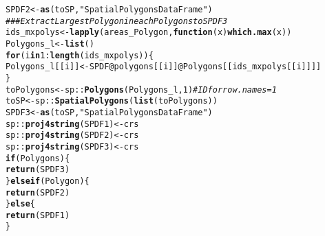 \documentclass[a4paper,12pt,times,numbered,print,index]{Classes/PhDThesisPSnPDF}\usepackage[]{graphicx}\usepackage[]{color}
\makeatletter
\newcommand{\hlnum}[1]{\textcolor[rgb]{0.686,0.059,0.569}{#1}}%
\newcommand{\hlstr}[1]{\textcolor[rgb]{0.192,0.494,0.8}{#1}}%
\newcommand{\hlcom}[1]{\textcolor[rgb]{0.678,0.584,0.686}{\textit{#1}}}%
\newcommand{\hlopt}[1]{\textcolor[rgb]{0,0,0}{#1}}%
\newcommand{\hlstd}[1]{\textcolor[rgb]{0.345,0.345,0.345}{#1}}%
\newcommand{\hlkwa}[1]{\textcolor[rgb]{0.161,0.373,0.58}{\textbf{#1}}}%
\newcommand{\hlkwb}[1]{\textcolor[rgb]{0.69,0.353,0.396}{#1}}%
\newcommand{\hlkwc}[1]{\textcolor[rgb]{0.333,0.667,0.333}{#1}}%
\newcommand{\hlkwd}[1]{\textcolor[rgb]{0.737,0.353,0.396}{\textbf{#1}}}%
\newenvironment{kframe}{%
 \def\at@end@of@kframe{}%
 \ifinner\ifhmode%
  \def\at@end@of@kframe{\end{minipage}}%
  \begin{minipage}{\columnwidth}%
 \fi\fi%
 \def\FrameCommand##1{\hskip\@totalleftmargin \hskip-\fboxsep
 \colorbox{shadecolor}{##1}\hskip-\fboxsep
     \hskip-\linewidth \hskip-\@totalleftmargin \hskip\columnwidth}%
 \MakeFramed {\advance\hsize-\width
   \@totalleftmargin\z@ \linewidth\hsize
   \@setminipage}}%
 {\par\unskip\endMakeFramed%
 \at@end@of@kframe}
\newenvironment{knitrout}{}{} %
\renewenvironment{knitrout}{\begin{singlespace}}{\end{singlespace}}
\makeatother
\begin{document}
\begin{appendices}
\begin{knitrout}
\begin{kframe}
\begin{alltt}
        \hlstd{SPDF2}  \hlkwb{<-} \hlkwd{as}\hlstd{(toSP,} \hlstr{"SpatialPolygonsDataFrame"}\hlstd{)}
        \hlcom{### Extract Largest Polygon in each Polygons to SPDF3}
        \hlstd{ids_mxpolys} \hlkwb{<-} \hlkwd{lapply}\hlstd{(areas_Polygon,} \hlkwa{function}\hlstd{(}\hlkwc{x}\hlstd{)} \hlkwd{which.max}\hlstd{(x))}
        \hlstd{Polygons_l}  \hlkwb{<-} \hlkwd{list}\hlstd{()}
        \hlkwa{for} \hlstd{(i} \hlkwa{in} \hlnum{1}\hlopt{:}\hlkwd{length}\hlstd{(ids_mxpolys)) \{}
             \hlstd{Polygons_l[[i]]} \hlkwb{<-} \hlstd{SPDF}\hlopt{@}\hlkwc{polygons}\hlstd{[[i]]}\hlopt{@}\hlkwc{Polygons}\hlstd{[[ids_mxpolys[[i]]]]}
        \hlstd{\}}
        \hlstd{toPolygons}  \hlkwb{<-} \hlstd{sp::}\hlkwd{Polygons}\hlstd{(Polygons_l,} \hlnum{1}\hlstd{)} \hlcom{#ID for row.names = 1}
        \hlstd{toSP}  \hlkwb{<-} \hlstd{sp::}\hlkwd{SpatialPolygons}\hlstd{(}\hlkwd{list}\hlstd{(toPolygons))}
        \hlstd{SPDF3}  \hlkwb{<-} \hlkwd{as}\hlstd{(toSP,} \hlstr{"SpatialPolygonsDataFrame"}\hlstd{)}
        \hlstd{sp::}\hlkwd{proj4string}\hlstd{(SPDF1)}  \hlkwb{<-} \hlstd{crs}
        \hlstd{sp::}\hlkwd{proj4string}\hlstd{(SPDF2)}  \hlkwb{<-} \hlstd{crs}
        \hlstd{sp::}\hlkwd{proj4string}\hlstd{(SPDF3)}  \hlkwb{<-} \hlstd{crs}
        \hlkwa{if} \hlstd{(Polygons) \{}
                \hlkwd{return}\hlstd{(SPDF3)}
        \hlstd{\}} \hlkwa{else if} \hlstd{(Polygon) \{}
                \hlkwd{return}\hlstd{(SPDF2)}
        \hlstd{\}} \hlkwa{else} \hlstd{\{}
                \hlkwd{return}\hlstd{(SPDF1)}
        \hlstd{\}}


\end{alltt}
\end{kframe}
\end{knitrout}
\end{appendices}
\end{document}
